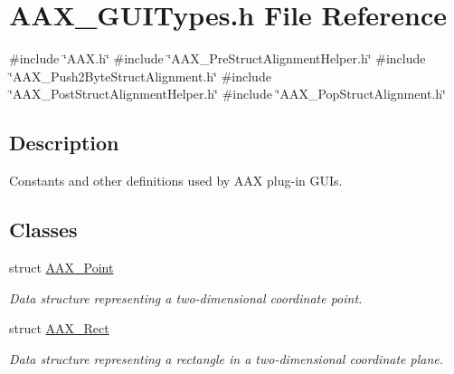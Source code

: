 \hypertarget{a00503}{}\section{A\+A\+X\+\_\+\+G\+U\+I\+Types.\+h File Reference}
\label{a00503}
{\ttfamily \#include \char`\"{}A\+A\+X.\+h\char`\"{}}\newline
{\ttfamily \#include \char`\"{}A\+A\+X\+\_\+\+Pre\+Struct\+Alignment\+Helper.\+h\char`\"{}}\newline
{\ttfamily \#include \char`\"{}A\+A\+X\+\_\+\+Push2\+Byte\+Struct\+Alignment.\+h\char`\"{}}\newline
{\ttfamily \#include \char`\"{}A\+A\+X\+\_\+\+Post\+Struct\+Alignment\+Helper.\+h\char`\"{}}\newline
{\ttfamily \#include \char`\"{}A\+A\+X\+\_\+\+Pop\+Struct\+Alignment.\+h\char`\"{}}\newline


\subsection{Description}
Constants and other definitions used by A\+AX plug-\/in G\+U\+Is. 

\subsection*{Classes}
\begin{DoxyCompactItemize}
\item 
struct \mbox{\hyperlink{a01609}{A\+A\+X\+\_\+\+Point}}
\begin{DoxyCompactList}\small\item\em Data structure representing a two-\/dimensional coordinate point. \end{DoxyCompactList}\item 
struct \mbox{\hyperlink{a01613}{A\+A\+X\+\_\+\+Rect}}
\begin{DoxyCompactList}\small\item\em Data structure representing a rectangle in a two-\/dimensional coordinate plane. \end{DoxyCompactList}\end{DoxyCompactItemize}
